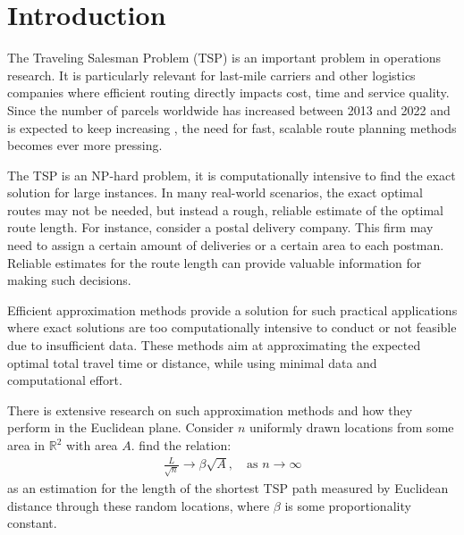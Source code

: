 \section{Introduction}
The Traveling Salesman Problem (TSP) is an important problem in operations research.
It is particularly relevant for last-mile carriers and other logistics companies where efficient
routing directly impacts cost, time and service quality. Since the number of parcels worldwide has
increased between 2013 and 2022 and is expected to keep increasing \citep{statista}, the need for
fast, scalable route planning methods becomes ever more pressing.

The TSP is an NP-hard problem, it is computationally intensive to find the exact solution for
large instances. In many real-world scenarios, the exact optimal routes may not be needed, but
instead a rough, reliable estimate of the optimal route length. For instance, consider a postal delivery company.
This firm may need to assign a certain amount of deliveries or a certain area to each postman.
Reliable estimates for the route length can provide valuable information for making such decisions.

Efficient approximation methods provide a solution for such practical applications where exact
solutions are too computationally intensive to conduct or not feasible due to insufficient data.
These methods aim at approximating the expected optimal total travel time or distance, while using
minimal data and computational effort.

There is extensive research on such approximation methods and how they perform in the Euclidean
plane.
Consider $n$ uniformly drawn locations from some area in $\mathbb{R}^2$ with area $A$.
\citet{beardwood1959shortest} find the relation:
\begin{align}
	\frac{L}{\sqrt n} \to \beta \sqrt{A}, \quad \text{as } n \to \infty
	\label{eq:beardwood}
\end{align}
as an estimation for the length of the shortest TSP path measured by Euclidean distance through
these random locations, where $\beta$ is some proportionality constant. 

